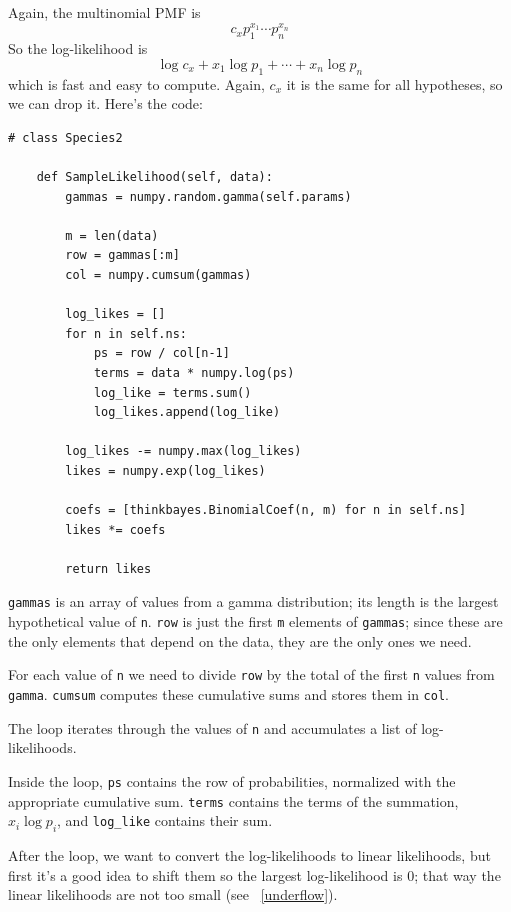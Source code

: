 \documentclass[12pt]{book}
\begin{document}
Again, the multinomial PMF is
%
\[ c_x p_1^{x_1} \cdots p_n^{x_n} \]
%
So the log-likelihood is
%
\[ \log c_x + x_1 \log p_1 + \cdots + x_n \log p_n \]
%
which is fast and easy to compute.  Again, $c_x$
it is the same for all hypotheses, so we can drop it.
Here's the code:

\begin{verbatim}
# class Species2

    def SampleLikelihood(self, data):
        gammas = numpy.random.gamma(self.params)

        m = len(data)
        row = gammas[:m]
        col = numpy.cumsum(gammas)

        log_likes = []
        for n in self.ns:
            ps = row / col[n-1]
            terms = data * numpy.log(ps)
            log_like = terms.sum()
            log_likes.append(log_like)

        log_likes -= numpy.max(log_likes)
        likes = numpy.exp(log_likes)

        coefs = [thinkbayes.BinomialCoef(n, m) for n in self.ns]
        likes *= coefs

        return likes
\end{verbatim}

{\tt gammas} is an array of values from a gamma distribution; its
length is the largest hypothetical value of {\tt n}.  {\tt row} is
just the first {\tt m} elements of {\tt gammas}; since these are the
only elements that depend on the data, they are the only ones we need.

For each value of {\tt n} we need to divide {\tt row} by the
total of the first {\tt n} values from {\tt gamma}.  {\tt cumsum}
computes these cumulative sums and stores them in {\tt col}.

The loop iterates through the values of {\tt n} and accumulates
a list of log-likelihoods.

Inside the loop, {\tt ps} contains the row of probabilities, normalized
with the appropriate cumulative sum.  {\tt terms} contains the
terms of the summation, $x_i \log p_i$, and \verb"log_like" contains
their sum.

After the loop, we want to convert the log-likelihoods to linear
likelihoods, but first it's a good idea to shift them so the largest
log-likelihood is 0; that way the linear likelihoods are not too
small (see ~\ref{underflow}).
\end{document}
